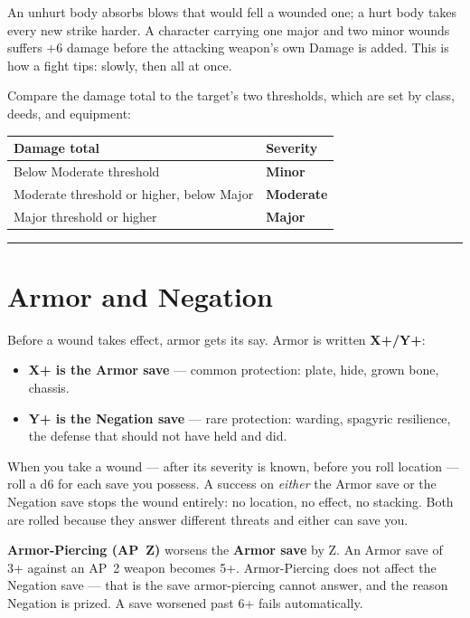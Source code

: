 An unhurt body absorbs blows that would fell a wounded one; a hurt body takes every new strike harder. A character carrying one major and two minor wounds suffers $+6$ damage before the attacking weapon's own Damage is added. This is how a fight tips: slowly, then all at once.

Compare the damage total to the target's two thresholds, which are set by class, deeds, and equipment:

\begin{center}
\begin{tabular}{ll}
\textbf{Damage total} & \textbf{Severity} \\
\hline
Below Moderate threshold & \textbf{Minor} \\
Moderate threshold or higher, below Major & \textbf{Moderate} \\
Major threshold or higher & \textbf{Major} \\
\end{tabular}
\end{center}

\medskip\hrule\medskip

\section{Armor and Negation}

Before a wound takes effect, armor gets its say. Armor is written \textbf{X+/Y+}:

\begin{itemize}
    \item \textbf{X+ is the Armor save} --- common protection: plate, hide, grown bone, chassis.
    \item \textbf{Y+ is the Negation save} --- rare protection: warding, spagyric resilience, the defense that should not have held and did.
\end{itemize}

When you take a wound --- after its severity is known, before you roll location --- roll a d6 for each save you possess. A success on \textit{either} the Armor save or the Negation save stops the wound entirely: no location, no effect, no stacking. Both are rolled because they answer different threats and either can save you.

\textbf{Armor-Piercing (AP~Z)} worsens the \textbf{Armor save} by Z. An Armor save of 3+ against an AP~2 weapon becomes 5+. Armor-Piercing does not affect the Negation save --- that is the save armor-piercing cannot answer, and the reason Negation is prized. A save worsened past 6+ fails automatically.

